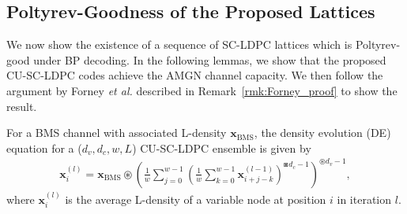 \documentclass[conference]{IEEEtran}
\begin{document}
\subsection{Poltyrev-Goodness of the Proposed Lattices}
We now show the existence of a sequence of SC-LDPC lattices which is Poltyrev-good under BP decoding. In the following lemmas, we show that the proposed CU-SC-LDPC codes achieve the AMGN channel capacity. We then follow the argument by Forney \textit{et al.} described in Remark~\ref{rmk:Forney_proof} to show the result.

\begin{lemma}\label{lemma:DE_SCLDPC}
For a BMS channel with associated L-density $\mathbf{x}_{\text{BMS}}$, the density evolution (DE) equation for a ($d_{v},d_{c},w,L$) CU-SC-LDPC ensemble is given by
\begin{align}
\mathbf{x}_{i}^{(l)}=\mathbf{x}_{\text{BMS}}\circledast\left(\frac{1}{w}\sum_{j=0}^{w-1}\left(\frac{1}{w}\sum_{k=0}^{w-1}\mathbf{x}_{i+j-k}^{(l-1)}\right)^{\boxast d_{c}-1} \right)^{\circledast d_{v}-1},
\label{Eqn:DE_SCLDPC}
\end{align}
where $\mathbf{x}_{i}^{(l)}$ is the average L-density of a variable node at position $i$ in iteration $l$.
\end{lemma}
\end{document}
